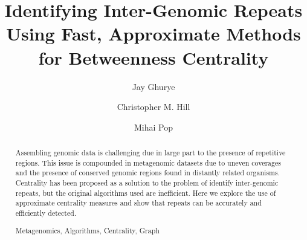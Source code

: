 \documentclass[runningheads,a4paper]{llncs}
\newcommand{\keywords}[1]{\par\addvspace\baselineskip
\noindent\keywordname\enspace\ignorespaces#1}
\begin{document}
\mainmatter  %

\title{Identifying Inter-Genomic Repeats Using Fast, Approximate Methods for Betweenness Centrality}


%
%
\author{Jay Ghurye%
\and Christopher M. Hill\and Mihai Pop}
%


%
%

\maketitle


\begin{abstract}
Assembling genomic data is challenging due in large part to the presence of repetitive regions.
This issue is compounded in metagenomic datasets due to uneven coverages and the presence of conserved genomic regions found in distantly related organisms.
Centrality has been proposed as a solution to the problem of identify inter-genomic repeats, but the original algorithms used are inefficient.
Here we explore the use of approximate centrality measures and show that repeats can be accurately and efficiently detected.
\keywords{Metagenomics, Algorithms, Centrality, Graph}
\end{abstract}
\end{document}
